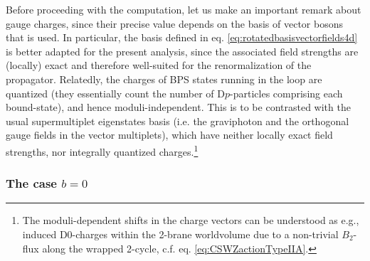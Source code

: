 		
Before proceeding with the computation, let us make an important remark about gauge charges, since their precise value depends on the basis of vector bosons that is used. In particular, the basis defined in eq. \eqref{eq:rotatedbasisvectorfields4d} is better adapted for the present analysis, since the associated field strengths are (locally) exact and therefore well-suited for the renormalization of the propagator. Relatedly, the charges of BPS states running in the loop are quantized (they essentially count the number of D$p$-particles comprising each bound-state), and hence moduli-independent. This is to be contrasted with the usual supermultiplet eigenstates basis (i.e. the graviphoton and the orthogonal gauge fields in the vector multiplets), which have neither locally exact field strengths, nor integrally quantized charges.\footnote{The moduli-dependent shifts in the charge vectors can be understood as e.g., induced D0-charges within the 2-brane worldvolume due to a non-trivial $B_2$-flux along the wrapped 2-cycle, c.f. eq. \eqref{eq:CSWZactionTypeIIA}.}
		
\subsubsection*{The case $b=0$}
		
